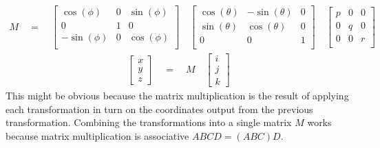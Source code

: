\documentclass[letterpaper,10pt,english]{sphinxmanual}
\begin{document}
\begin{equation*}
\begin{split}
M
\quad
=
\quad
\begin{bmatrix}
\cos(\phi) & 0 & \sin(\phi) \\
0 & 1 & 0 \\
-\sin(\phi) & 0 & \cos(\phi) \\
\end{bmatrix}
\quad
\begin{bmatrix}
\cos(\theta) &  -\sin(\theta) & 0 \\
\sin(\theta) & \cos(\theta) & 0 \\
0 & 0 & 1 \\
\end{bmatrix}
\quad
\begin{bmatrix}
p & 0 & 0 \\
0 & q & 0 \\
0 & 0 & r \\
\end{bmatrix}
\end{split}
\end{equation*}\begin{equation*}
\begin{split}
\begin{bmatrix}
x \\
y \\
z 
\end{bmatrix}
\quad
=
\quad
M
\quad
\begin{bmatrix}
i \\
j \\
k
\end{bmatrix}
\end{split}
\end{equation*}
This might be obvious because the matrix multiplication is the result of
applying each transformation in turn on the coordinates output from the
previous transformation. Combining the transformations into a single matrix
\(M\) works because matrix multiplication is associative \textendash{} \(ABCD = (ABC)D\).
\end{document}
